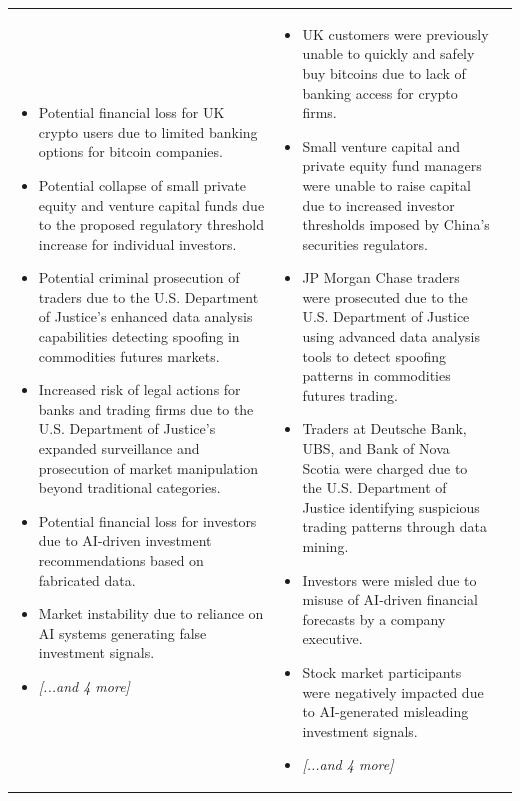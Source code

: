 \begin{longtable}{p{5.2cm}|p{5.2cm}|p{5.2cm}}
\begin{itemize}[leftmargin=*, nosep, before=\vspace{-0.5\baselineskip}, after=\vspace{-0.5\baselineskip}]
\footnotesize
\item Potential financial loss for UK crypto users due to limited banking options for bitcoin companies.
\item Potential collapse of small private equity and venture capital funds due to the proposed regulatory threshold increase for individual investors.
\item Potential criminal prosecution of traders due to the U.S. Department of Justice's enhanced data analysis capabilities detecting spoofing in commodities futures markets.
\item Increased risk of legal actions for banks and trading firms due to the U.S. Department of Justice's expanded surveillance and prosecution of market manipulation beyond traditional categories.
\item Potential financial loss for investors due to AI-driven investment recommendations based on fabricated data.
\item Market instability due to reliance on AI systems generating false investment signals.
\item \textit{[...and 4 more]}
\end{itemize} & \begin{itemize}[leftmargin=*, nosep, before=\vspace{-0.5\baselineskip}, after=\vspace{-0.5\baselineskip}] 
\footnotesize
\item UK customers were previously unable to quickly and safely buy bitcoins due to lack of banking access for crypto firms.
\item Small venture capital and private equity fund managers were unable to raise capital due to increased investor thresholds imposed by China's securities regulators.
\item JP Morgan Chase traders were prosecuted due to the U.S. Department of Justice using advanced data analysis tools to detect spoofing patterns in commodities futures trading.
\item Traders at Deutsche Bank, UBS, and Bank of Nova Scotia were charged due to the U.S. Department of Justice identifying suspicious trading patterns through data mining.
\item Investors were misled due to misuse of AI-driven financial forecasts by a company executive.
\item Stock market participants were negatively impacted due to AI-generated misleading investment signals.
\item \textit{[...and 4 more]}

\end{itemize}
\end{longtable}
